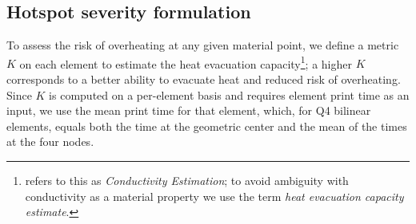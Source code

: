 \documentclass{article}
\begin{document}
\subsection{Hotspot severity formulation}
\label{sec:hotspot_formulation}
To assess the risk of overheating at any given material point, we define a metric $K$ on each element to estimate the heat evacuation capacity\footnote{\cite{das2023thesis} refers to this as \emph{Conductivity Estimation}; to avoid ambiguity with conductivity as a material property we use the term \emph{heat evacuation capacity estimate}.}; a higher $K$ corresponds to a better ability to evacuate heat and reduced risk of overheating. Since $K$ is computed on a per-element basis and requires element print time as an input, we use the mean print time for that element, which, for Q4 bilinear elements, equals both the time at the geometric center and the mean of the times at the four nodes.
\end{document}
